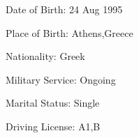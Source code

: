 



\begin{cvskills}



    \cvskill
    {Date of Birth:} %
    {24 Aug 1995} %


    \cvskill
    {Place of Birth:} %
    {Athens,Greece} %

    \cvskill
    {Nationality:} %
    {Greek} %

    \cvskill
    {Military Service:} %
    {Ongoing} %



    \cvskill
    {Marital Status:} %
    {Single} %


    \cvskill
    {Driving License:} %
    {Α1,Β} %

\end{cvskills}
